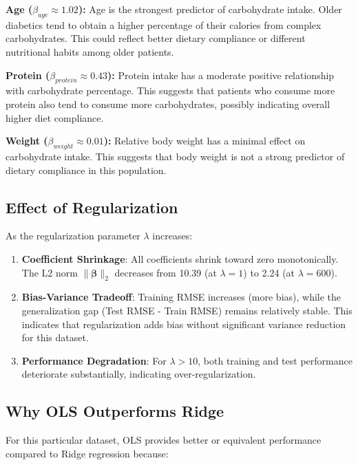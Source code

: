 \documentclass{article}
\begin{document}
\textbf{Age ($\beta_{age} \approx 1.02$):} Age is the strongest predictor of carbohydrate intake. Older diabetics tend to obtain a higher percentage of their calories from complex carbohydrates. This could reflect better dietary compliance or different nutritional habits among older patients.

\textbf{Protein ($\beta_{protein} \approx 0.43$):} Protein intake has a moderate positive relationship with carbohydrate percentage. This suggests that patients who consume more protein also tend to consume more carbohydrates, possibly indicating overall higher diet compliance.

\textbf{Weight ($\beta_{weight} \approx 0.01$):} Relative body weight has a minimal effect on carbohydrate intake. This suggests that body weight is not a strong predictor of dietary compliance in this population.

\subsection{Effect of Regularization}

As the regularization parameter $\lambda$ increases:

\begin{enumerate}
    \item \textbf{Coefficient Shrinkage}: All coefficients shrink toward zero monotonically. The L2 norm $\|\boldsymbol{\beta}\|_2$ decreases from 10.39 (at $\lambda=1$) to 2.24 (at $\lambda=600$).
    
    \item \textbf{Bias-Variance Tradeoff}: Training RMSE increases (more bias), while the generalization gap (Test RMSE - Train RMSE) remains relatively stable. This indicates that regularization adds bias without significant variance reduction for this dataset.
    
    \item \textbf{Performance Degradation}: For $\lambda > 10$, both training and test performance deteriorate substantially, indicating over-regularization.
\end{enumerate}

\subsection{Why OLS Outperforms Ridge}

For this particular dataset, OLS provides better or equivalent performance compared to Ridge regression because:
\end{document}
